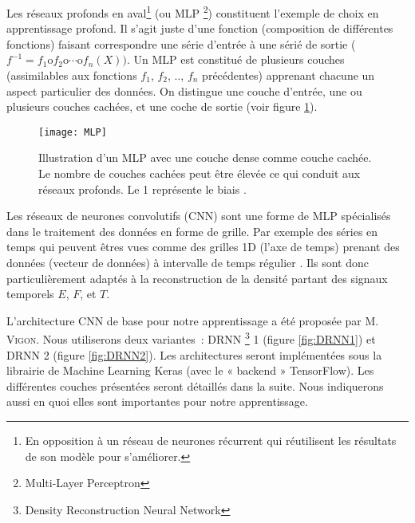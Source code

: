 Les réseaux profonds en aval\footnote{En opposition à un réseau de neurones récurrent qui réutilisent les résultats de son modèle pour s'améliorer.} (ou MLP \footnote{Multi-Layer Perceptron}) constituent l'exemple de choix en apprentissage profond. Il s'agit juste d'une fonction (composition de différentes fonctions) faisant correspondre une série d'entrée à une sérié de sortie ($f^{-1} = f_1 \text{o} f_2 \text{o} \cdots \text{o} f_n(X))$. Un MLP est constitué de plusieurs couches (assimilables aux fonctions $f_1$, $f_2$, .., $f_n$ précédentes) apprenant chacune un aspect particulier des données. On distingue une couche d'entrée, une ou plusieurs couches cachées, et une coche de sortie (voir figure \ref{fig:MLP}).


\begin{figure}[!h]
\centering
\texttt{[image: MLP]} 
\decoRule
\caption[MLP]{Illustration d'un MLP avec une couche dense comme couche cachée. Le nombre de couches cachées peut être élevée ce qui conduit aux réseaux profonds. Le 1 représente le biais \parencite[286]{Reference8}.}
\label{fig:MLP}
\end{figure}

Les réseaux de neurones convolutifs (CNN) sont une forme de MLP spécialisés dans le traitement des données en forme de grille. Par exemple des séries en temps qui peuvent êtres vues comme des grilles 1D (l'axe de temps) prenant des données (vecteur de données) à intervalle de temps régulier \parencite{Reference5}. Ils sont donc particulièrement adaptés à la reconstruction de la densité partant des signaux temporels $E$, $F$, et $T$. 

L'architecture CNN de base pour notre apprentissage a été proposée par M. \textsc{Vigon}. Nous utiliserons deux variantes : DRNN \footnote{Density Reconstruction Neural Network} 1 (figure \ref{fig:DRNN1}) et DRNN 2 (figure \ref{fig:DRNN2}). Les architectures seront implémentées sous la librairie de Machine Learning Keras (avec le « backend » TensorFlow). Les différentes couches présentées seront détaillés dans la suite. Nous indiquerons aussi en quoi elles sont importantes pour notre apprentissage.

% 

